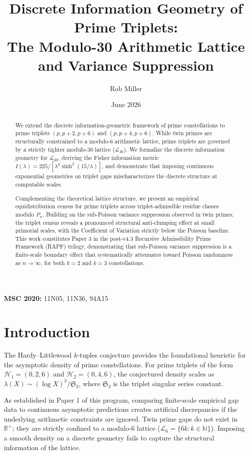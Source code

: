 \documentclass[11pt]{article}
\title{Discrete Information Geometry of Prime Triplets: \\ The Modulo-30 Arithmetic Lattice and Variance Suppression}
\author{Rob Miller}
\date{June 2026}
\begin{document}
\maketitle

\begin{abstract}
We extend the discrete information-geometric framework of prime constellations to prime triplets $(p, p+2, p+6)$ and $(p, p+4, p+6)$. While twin primes are structurally constrained to a modulo-6 arithmetic lattice, prime triplets are governed by a strictly tighter modulo-30 lattice ($\mathcal{L}_{30}$). We formalize the discrete information geometry for $\mathcal{L}_{30}$, deriving the Fisher information metric $I(\lambda) = 225/[\lambda^4 \sinh^2(15/\lambda)]$, and demonstrate that imposing continuous exponential geometries on triplet gaps mischaracterizes the discrete structure at computable scales. 

Complementing the theoretical lattice structure, we present an empirical equidistribution census for prime triplets across triplet-admissible residue classes modulo $P_n$. Building on the sub-Poisson variance suppression observed in twin primes, the triplet census reveals a pronounced structural anti-clumping effect at small primorial scales, with the Coefficient of Variation strictly below the Poisson baseline. This work constitutes Paper 3 in the post-v4.3 Recursive Admissibility Prime Framework (RAPF) trilogy, demonstrating that sub-Poisson variance suppression is a finite-scale boundary effect that systematically attenuates toward Poisson randomness as $n \to \infty$, for both $k=2$ and $k=3$ constellations.
\end{abstract}

\noindent \textbf{MSC 2020:} 11N05, 11N36, 94A15

\section{Introduction}

The Hardy--Littlewood $k$-tuples conjecture provides the foundational heuristic for the asymptotic density of prime constellations. For prime triplets of the form $\mathcal{H}_1 = (0, 2, 6)$ and $\mathcal{H}_2 = (0, 4, 6)$, the conjectured density scales as $\lambda(X) \sim (\log X)^3 / \mathfrak{S}_3$, where $\mathfrak{S}_3$ is the triplet singular series constant. 

As established in Paper 1 of this program, comparing finite-scale empirical gap data to continuous asymptotic predictions creates artificial discrepancies if the underlying arithmetic constraints are ignored. Twin prime gaps do not exist in $\mathbb{R}^+$; they are strictly confined to a modulo-6 lattice ($\mathcal{L}_6 = \{6k : k \in \mathbb{N}\}$). Imposing a smooth density on a discrete geometry fails to capture the structural information of the lattice.
\end{document}
